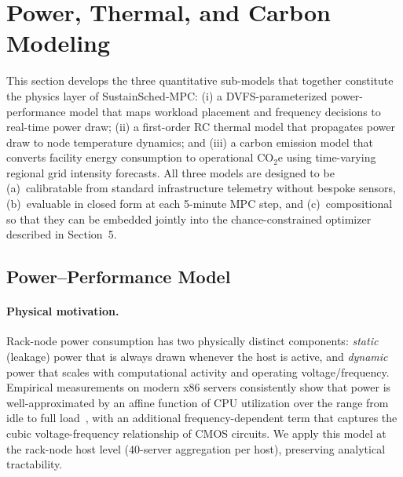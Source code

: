 \documentclass[a4paper,fleqn]{cas-dc}
\begin{document}
\section{Power, Thermal, and Carbon Modeling}
\label{sec:models}

This section develops the three quantitative sub-models that together constitute the physics layer of SustainSched-MPC: (i) a DVFS-parameterized power-performance model that maps workload placement and frequency decisions to real-time power draw; (ii) a first-order RC thermal model that propagates power draw to node temperature dynamics; and (iii) a carbon emission model that converts facility energy consumption to operational CO$_{2}$e using time-varying regional grid intensity forecasts. All three models are designed to be (a)~calibratable from standard infrastructure telemetry without bespoke sensors, (b)~evaluable in closed form at each 5-minute MPC step, and (c)~compositional so that they can be embedded jointly into the chance-constrained optimizer described in Section~5.

\subsection{Power--Performance Model}
\label{sec:power_model}

\paragraph{Physical motivation.}
Rack-node power consumption has two physically distinct components: \emph{static} (leakage) power that is always drawn whenever the host is active, and \emph{dynamic} power that scales with computational activity and operating voltage/frequency. Empirical measurements on modern x86 servers consistently show that power is well-approximated by an affine function of CPU utilization over the range from idle to full load~\cite{ref-beloglazov-fgcs,ref-kocot23}, with an additional frequency-dependent term that captures the cubic voltage-frequency relationship of CMOS circuits. We apply this model at the rack-node host level (40-server aggregation per host), preserving analytical tractability.
\end{document}
